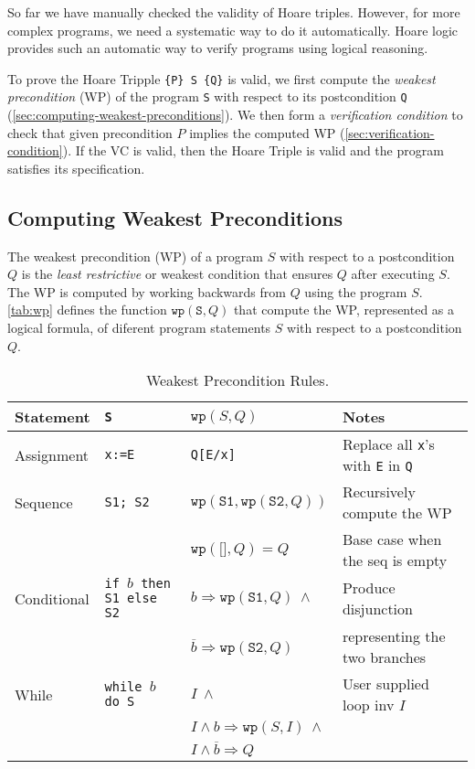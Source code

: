 \documentclass[oneside,11pt,dvipsnames]{book}
\renewcommand{\implies}{\Rightarrow}
\newcommand{\code}[1]{\texttt{#1}}
\begin{document}
So far we have manually checked the validity of Hoare triples. However, for more complex programs, we need a systematic way to do it automatically. Hoare logic provides such an automatic way to verify programs using logical reasoning.

To prove the Hoare Tripple \code{\{P\}\ \code{S} \{Q\}} is
valid, we first compute the \emph{weakest precondition} (WP) of the program \code{S} with respect to its postcondition \code{Q} (\autoref{sec:computing-weakest-preconditions}). We then form a \emph{verification condition} to check that given precondition $P$ implies the computed WP (\autoref{sec:verification-condition}). If the VC is valid, then the Hoare Triple is valid and the program satisfies its specification.

\subsection{Computing Weakest Preconditions}\label{sec:computing-weakest-preconditions}

The weakest precondition (WP) of a program $S$ with respect to a postcondition $Q$ is the \emph{least restrictive} or weakest condition that ensures $Q$ after executing $S$. The WP is computed by working backwards from $Q$ using the program $S$. \autoref{tab:wp} defines the function $\code{wp}(\code{S}, Q)$ that compute the WP, represented as a logical formula, of diferent program statements $S$ with respect to a postcondition $Q$.

\begin{table}
    \caption{Weakest Precondition Rules.}\label{tab:wp}
    \centering
    \footnotesize
\begin{tabular}{l|l|l|l}
\textbf{Statement} & \code{S} & $\code{wp}(S,Q)$ & Notes\\
\midrule
Assignment & \code{x:=E} & \code{Q[E/x]} & Replace all \code{x}'s with \code{E} in \code{Q} \\
\midrule
Sequence & \code{S1; S2} & $\code{wp}(\code{S1}, \code{wp}(\code{S2}, Q))$ & Recursively compute the WP\\
&& $\code{wp}(\code{[]}, Q) = Q$ & Base case when the seq is empty\\
\midrule
Conditional & \code{if $b$ then S1 else S2} & $b \implies \code{wp}(\code{S1},Q)~\land$ & Produce disjunction\\
  & & $\overline{b} \implies \code{wp}(\code{S2},Q)$ & representing the two branches\\
\midrule
While & \code{while $b$ do S} & $I ~\land $ & User supplied loop inv $I$\\
&& $I \land b \implies \code{wp}(S, I) ~\land$ &\\ 
&& $I \land \overline{b} \implies Q$ &\\ 
\bottomrule
\end{tabular}
\end{table}
\end{document}
